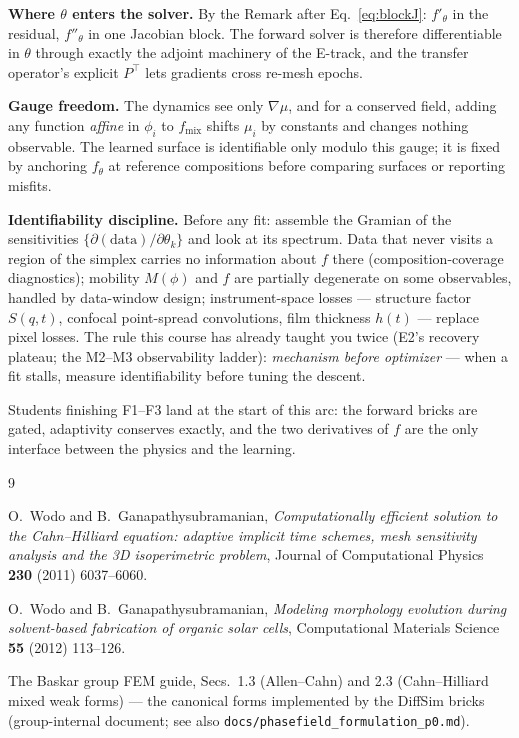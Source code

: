 \documentclass[11pt]{article}
\begin{document}
\textbf{Where $\theta$ enters the solver.} By the Remark after
Eq.~\eqref{eq:blockJ}: $f'_\theta$ in the residual, $f''_\theta$ in one
Jacobian block. The forward solver is therefore differentiable in
$\theta$ through exactly the adjoint machinery of the E-track, and the
transfer operator's explicit $P^{\!\top}$ lets gradients cross re-mesh
epochs.

\textbf{Gauge freedom.} The dynamics see only $\nabla\mu$, and for a
conserved field, adding any function \emph{affine} in $\phi_i$ to
$f_{\text{mix}}$ shifts $\mu_i$ by constants and changes nothing
observable. The learned surface is identifiable only modulo this gauge;
it is fixed by anchoring $f_\theta$ at reference compositions before
comparing surfaces or reporting misfits.

\textbf{Identifiability discipline.} Before any fit: assemble the
Gramian of the sensitivities $\{\partial(\text{data})/\partial
\theta_k\}$ and look at its spectrum. Data that never visits a region
of the simplex carries no information about $f$ there
(composition-coverage diagnostics); mobility $M(\phi)$ and $f$ are
partially degenerate on some observables, handled by data-window
design; instrument-space losses --- structure factor $S(q,t)$, confocal
point-spread convolutions, film thickness $h(t)$ --- replace pixel
losses. The rule this course has already taught you twice (E2's
recovery plateau; the M2--M3 observability ladder): \emph{mechanism
before optimizer} --- when a fit stalls, measure identifiability before
tuning the descent.

Students finishing F1--F3 land at the start of this arc: the forward
bricks are gated, adaptivity conserves exactly, and the two derivatives
of $f$ are the only interface between the physics and the learning.

\begin{thebibliography}{9}

O.~Wodo and B.~Ganapathysubramanian,
\emph{Computationally efficient solution to the Cahn--Hilliard equation:
adaptive implicit time schemes, mesh sensitivity analysis and the 3D
isoperimetric problem},
Journal of Computational Physics \textbf{230} (2011) 6037--6060.

O.~Wodo and B.~Ganapathysubramanian,
\emph{Modeling morphology evolution during solvent-based fabrication of
organic solar cells},
Computational Materials Science \textbf{55} (2012) 113--126.

The Baskar group FEM guide, Secs.~1.3 (Allen--Cahn) and 2.3
(Cahn--Hilliard mixed weak forms) --- the canonical forms implemented
by the DiffSim bricks (group-internal document; see also
\texttt{docs/phasefield\_formulation\_p0.md}).

\end{thebibliography}
\end{document}
